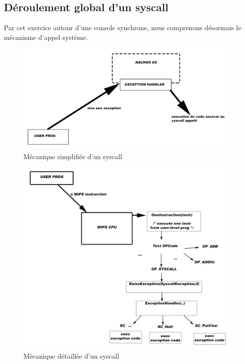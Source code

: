 \documentclass[a4paper,10pt]{article}
\begin{document}
\subsection{Déroulement global d'un syscall}
Par cet exercice autour d'une console synchrone, nous comprenons désormais le mécanisme d'appel système.
\begin{figure}[h]
  \begin{center}
    \includegraphics[scale=0.2]{./nachos_syscall.png}
   \caption{\label{syscall} Mécanique simplifiée d'un syscall}
  \end{center}
\end{figure}
\begin{figure}[h]

\begin{center}
    \includegraphics[scale=0.3]{./nachos_syscall_details.png}
   \caption{\label{syscall_det} Mécanique détaillée d'un syscall}
  \end{center}
\end{figure}
\end{document}
